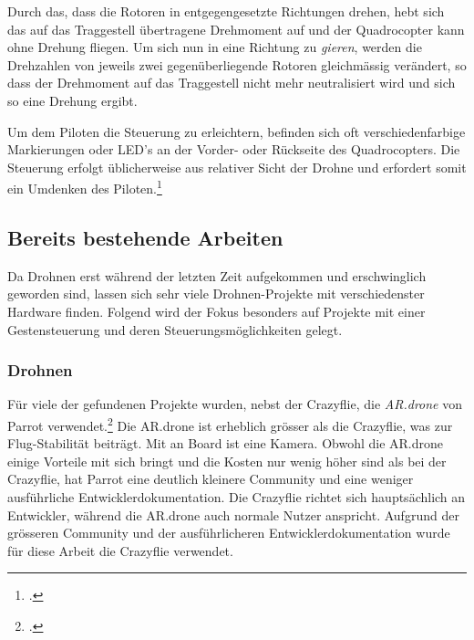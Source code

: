 Durch das, dass die Rotoren in entgegengesetzte Richtungen drehen, hebt sich das auf das Traggestell übertragene Drehmoment auf und der Quadrocopter kann ohne Drehung fliegen.
Um sich nun in eine Richtung zu \textit{gieren}, werden die Drehzahlen von jeweils zwei gegenüberliegende Rotoren gleichmässig verändert, so dass der Drehmoment auf das Traggestell nicht mehr neutralisiert wird und sich so eine Drehung ergibt.

Um dem Piloten die Steuerung zu erleichtern, befinden sich oft verschiedenfarbige Markierungen oder LED's an der Vorder- oder Rückseite des Quadrocopters.
Die Steuerung erfolgt üblicherweise aus relativer Sicht der Drohne und erfordert somit ein Umdenken des Piloten.\footcite{Quadrocopter__Wikipedia_2015-03-22}


\subsection{Bereits bestehende Arbeiten}
Da Drohnen erst während der letzten Zeit aufgekommen und erschwinglich geworden sind, lassen sich sehr viele Drohnen-Projekte mit verschiedenster Hardware finden.
Folgend wird der Fokus besonders auf Projekte mit einer Gestensteuerung und deren Steuerungsmöglichkeiten gelegt.


\subsubsection{Drohnen}
Für viele der gefundenen Projekte wurden, nebst der Crazyflie, die \textit{AR.drone} von Parrot verwendet.\footcite{AR_Drone_2.0_Parrot_2015-04-29}
Die AR.drone ist erheblich grösser als die Crazyflie, was zur Flug-Stabilität beiträgt.
Mit an Board ist eine Kamera.
Obwohl die AR.drone einige Vorteile mit sich bringt und die Kosten nur wenig höher sind als bei der Crazyflie, hat Parrot eine deutlich kleinere Community und eine weniger ausführliche Entwicklerdokumentation.
Die Crazyflie richtet sich hauptsächlich an Entwickler, während die AR.drone auch normale Nutzer anspricht.
Aufgrund der grösseren Community und der ausführlicheren Entwicklerdokumentation wurde für diese Arbeit die Crazyflie verwendet.

